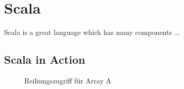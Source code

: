 \section{Scala}
\label{abs:einleitung_echt}
Scala is a great language which has many components ...


\subsection{Scala in Action}
\label{abs:Scala in Action}


\begin{figure}[h]
  \centering
  \caption{Reihungszugriff für Array A}
  \label{fig:1}
\end{figure}

